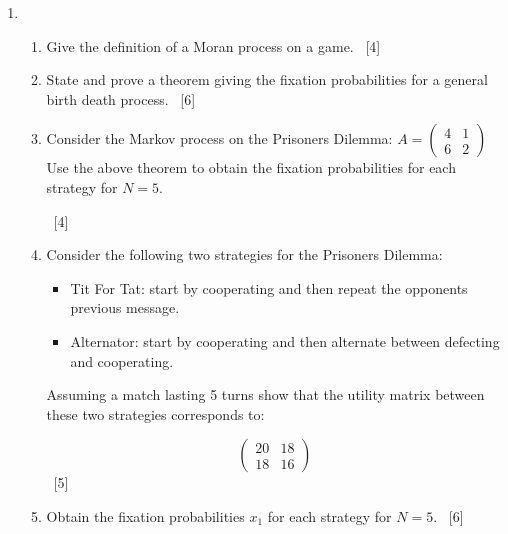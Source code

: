 \documentclass[12pt,a4paper]{article}
\makeatletter
\renewcommand{\@oddfoot}{\hfil \arabic{page} \hfil}    %
\makeatother
\begin{document}
\begin{enumerate}
\newpage
\item

    \begin{enumerate}
        \item Give the definition of a Moran process on a game.
            ~\hfill{[4]}
        \item State and prove a theorem giving the fixation probabilities for a
            general birth death process.
            ~\hfill{[6]}
        \item Consider the Markov process on the Prisoners Dilemma:
        \(A = \begin{pmatrix} 4 & 1\\ 6 & 2 \end{pmatrix}\)
            Use the above theorem to obtain the fixation probabilities for each
            strategy for \(N=5\).

            ~\hfill{[4]}
        \item Consider the following two strategies for the Prisoners Dilemma:
            \begin{itemize}
                \item Tit For Tat: start by cooperating and then repeat the
                    opponents previous message.
                \item Alternator: start by cooperating and then alternate
                    between defecting and cooperating.
            \end{itemize}
            Assuming a match lasting 5 turns show that the utility matrix
            between these two strategies corresponds to:

            \[
                \begin{pmatrix}
                    20 & 18\\
                    18 & 16
                \end{pmatrix}
            \]
                ~\hfill{[5]}
            \item Obtain the fixation probabilities \(x_1\) for each strategy
                for \(N=5\).
          ~\hfill{[6]}
    \end{enumerate}
\end{enumerate}


\makeatletter
\renewcommand{\@oddfoot}{\hfil \arabic{page}X \hfil}    %
\makeatother
\end{document}
